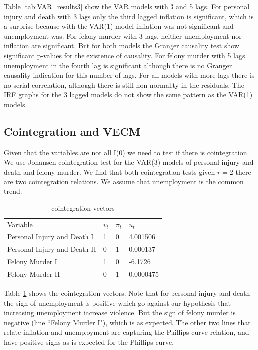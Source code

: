 \documentclass[11pt, a4paper]{article}
\begin{document}
Table \ref{tab:VAR_results3} show the VAR models with 3 and 5 lags. For personal injury and death with 3 lags only the third lagged inflation is significant, which is a surprise because with the VAR(1) model inflation was not significant and unemployment was. For felony murder with 3 lags, neither unemployment nor inflation are significant. 
But for both models the Granger causality test show significant p-values for the existence of causality. For felony murder with 5 lags unemployment in the fourth lag is significant although there is no Granger causality indication for this number of lags. 
For all models with more lags there is no serial correlation, although there is still non-normality in the residuals.
The IRF graphs for the 3 lagged models do not show the same pattern as the VAR(1) models.

\subsection{Cointegration and VECM }

Given that the variables are not all I(0) we need to test if there is cointegration. We use Johansen cointegration test for the VAR(3) models of personal injury and death and felony murder. We find that both cointegration tests given $r=2$ there are two cointegration relations. We assume that unemployment is the common trend. 




\begin{table}[H]
\centering 
\caption{cointegration vectors}
\label{tab:cointegration_vectors}
\begin{tabular}{l l l l }\hline\hline 
Variable & $ v_t $  &  $ \pi_t $ &  $u_t$ \\ 
Personal Injury and Death I & 1 & 0   & 4.001506  \\
Personal Injury and Death II & 0 &  1  & 0.000137 \\
Felony Murder I & 1 & 0 & -6.1726 \\
Felony Murder II & 0 & 1 & 0.0000475 \\
\hline\hline
\end{tabular}
\end{table}


Table \ref{tab:cointegration_vectors} shows the cointegration vectors. Note that for personal injury and death the sign of unemployment is positive which go against our hypothesis that increasing unemployment increase violence. 
But the sign of felony murder is negative (line ``Felony Murder I"), which is as expected. The other two lines that relate inflation and unemployment are capturing the Phillips curve relation, and have positive signs as is expected for the Phillips curve. 
\end{document}
